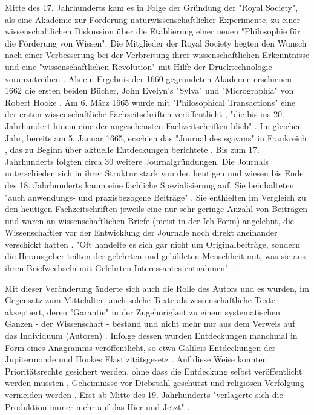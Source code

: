 Mitte des 17. Jahrhunderts kam es in Folge der Gründung der "Royal Society", als eine Akademie zur Förderung naturwissenschaftlicher Experimente, zu einer wissenschaftlichen Diskussion über die Etablierung einer neuen "Philosophie für die Förderung von Wissen". Die Mitglieder der Royal Society hegten den Wunsch nach einer Verbesserung bei der Verbreitung ihrer wissenschaftlichen Erkenntnisse und eine "wissenschaftlichen Revolution" mit Hilfe der Drucktechnologie voranzutreiben \cite{Dear_1985}. Als ein Ergebnis der 1660 gegründeten Akademie erschienen 1662 die ersten beiden Bücher, John Evelyn's "Sylva" und "Micrographia" von Robert Hooke \cite{hall_1992_library_rsol}. Am 6. März 1665 wurde mit "Philosophical Transactions" eine der ersten wissenschaftliche Fachzeitschriften veröffentlicht \cite{Peters_2014}, "die bis ins 20. Jahrhundert hinein eine der angesehensten Fachzeitschriften blieb" \cite{graefen2007_wissenschaftliche_artikel}. Im gleichen Jahr, bereits am  5. Januar 1665, erschien das "Journal des sçavans" in Frankreich \cite{ball_2011_zeitalter}, \cite{hollricher_wandel_2009} das zu Beginn über aktuelle Entdeckungen berichtete \cite{epaa_Weiner_2001}. Bis zum 17. Jahrhunderts folgten circa 30 weitere Journalgründungen. Die Journals unterschieden sich in ihrer Struktur stark von den heutigen und wiesen bis Ende des 18. Jahrhunderts kaum eine fachliche Spezialisierung auf. Sie beinhalteten "auch anwendungs- und praxisbezogene Beiträge" \cite{graefen2007_wissenschaftliche_artikel}. Sie enthielten im Vergleich zu den heutigen Fachzeitschriften jeweils eine nur sehr geringe Anzahl von Beiträgen \cite{suchen} und waren an wissenschaftlichen Briefe (meist in der Ich-Form) angelehnt, die Wissenschaftler vor der Entwicklung der Journale noch direkt aneinander verschickt hatten \cite{epaa_Weiner_2001}. "Oft handelte es sich gar nicht um Originalbeiträge, sondern die Herausgeber teilten der gelehrten und gebildeten Menschheit mit, was sie aus ihren Briefwechseln mit Gelehrten Interessantes entnahmen" \cite{graefen2007_wissenschaftliche_artikel}.

Mit dieser Veränderung änderte sich auch die Rolle des Autors und es wurden, im Gegensatz zum Mittelalter, auch solche Texte als wissenschaftliche Texte akzeptiert, deren "Garantie" in der Zugehörigkeit zu einem systematischen Ganzen - der Wissenschaft - bestand und nicht mehr nur aus dem Verweis auf das Individuum (Autoren) \cite{foucault_2000_autor}. Infolge dessen wurden Entdeckungen manchmal in Form eines Anagramms veröffentlicht, so etwa Galileis Entdeckungen der Jupitermonde \cite{miner2007discovery} und Hookes Elastizitätsgesetz \cite{szabo_2013_geschichte}. Auf diese Weise konnten Prioritätsrechte gesichert werden, ohne dass die Entdeckung selbst veröffentlicht werden mussten \cite{miner2007discovery}, Geheimnisse vor Diebstahl geschützt und religiösen Verfolgung vermeiden werden \cite{resnik_2005_ethics}. Erst ab Mitte des 19. Jahrhunderts "verlagerte sich die Produktion immer mehr auf das Hier und Jetzt" \cite{hagner_2015_sache_buches}.

